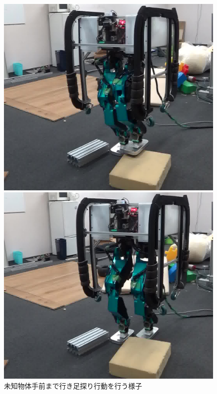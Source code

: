 \documentclass[twocolumn]{preport}
\begin{document}
\begin{figure}[tbh]
\begin{minipage}{0.24\columnwidth}
    \includegraphics[width=0.95\columnwidth]{checksoft63}
  \end{minipage}
  \begin{minipage}{0.24\columnwidth}
    \includegraphics[width=0.95\columnwidth]{checksoft123}
  \end{minipage}
  \caption{未知物体手前まで行き足探り行動を行う様子}
  \label{checksoft}
\end{figure}
\end{document}
